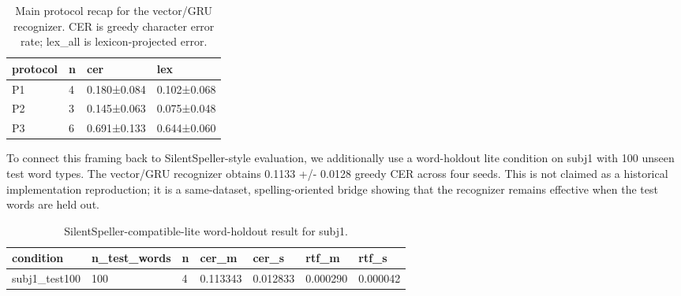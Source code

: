 
\begin{table}[t]
\centering
\caption{Main protocol recap for the vector/GRU recognizer. CER is greedy character error rate; lex_all is lexicon-projected error.}
\label{tab:main_protocols}
\begin{tabular}{llll}
\hline
protocol & n & cer & lex \\
\hline
P1 & 4 & 0.180±0.084 & 0.102±0.068 \\
P2 & 3 & 0.145±0.063 & 0.075±0.048 \\
P3 & 6 & 0.691±0.133 & 0.644±0.060 \\
\hline
\end{tabular}
\end{table}

To connect this framing back to SilentSpeller-style evaluation, we additionally use a word-holdout lite condition on subj1 with 100 unseen test word types. The vector/GRU recognizer obtains 0.1133 +/- 0.0128 greedy CER across four seeds. This is not claimed as a historical implementation reproduction; it is a same-dataset, spelling-oriented bridge showing that the recognizer remains effective when the test words are held out.


\begin{table}[t]
\centering
\caption{SilentSpeller-compatible-lite word-holdout result for subj1.}
\label{tab:silentspeller_lite}
\begin{tabular}{lllllll}
\hline
condition & n_test_words & n & cer_m & cer_s & rtf_m & rtf_s \\
\hline
subj1_test100 & 100 & 4 & 0.113343 & 0.012833 & 0.000290 & 0.000042 \\
\hline
\end{tabular}
\end{table}

